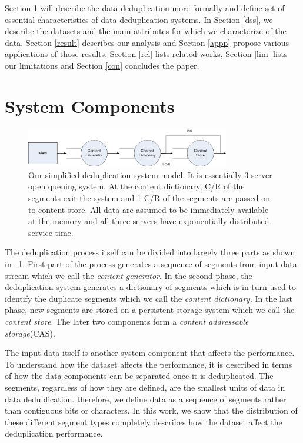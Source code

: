 Section \ref{sys} will describe the data deduplication more formally and define set of essential characteristics of data deduplication systems. In Section \ref{dss}, we describe the datasets and the main attributes for which we characterize of the data. Section \ref{result} describes our analysis and Section \ref{appp} propose various applications of those results. Section \ref{rel} lists related works, Section \ref{lim} lists our limitations and Section \ref{con} concludes the paper.

\section{System Components}\label{sys}

\begin{figure}[!t]
\centering
\includegraphics[width=3.5in]{figure/dedup/queue}
\caption{Our simplified deduplication system model. It is essentially 3 server open queuing system. At the content dictionary, C/R of the segments exit the system and 1-C/R of the segments are passed on to content store. All data are assumed to be immediately available at the memory and all three servers have exponentially distributed service time.} 
\label{queue}
\end{figure}

The deduplication process itself can be divided into largely three parts as shown in \figurename~\ref{queue}. First part of the process generates a sequence of segments from input data stream which we call the \emph{content generator}. In the second phase, the deduplication system generates a dictionary of segments which is in turn used to identify the duplicate segments which we call the \emph{content dictionary}. In the last phase, new segments are stored on a persistent storage system which we call the \emph{content store}. The later two components form a \emph{content addressable storage}(CAS).

The input data itself is another system component that affects the performance. To understand how the dataset affects the performance, it is described in terms of how the data components can be separated once it is deduplicated. The segments, regardless of how they are defined, are the smallest units of data in data deduplication. therefore, we define data as a sequence of segments rather than contiguous bits or characters. In this work, we show that the distribution of these different segment types completely describes how the dataset affect the deduplication performance.

